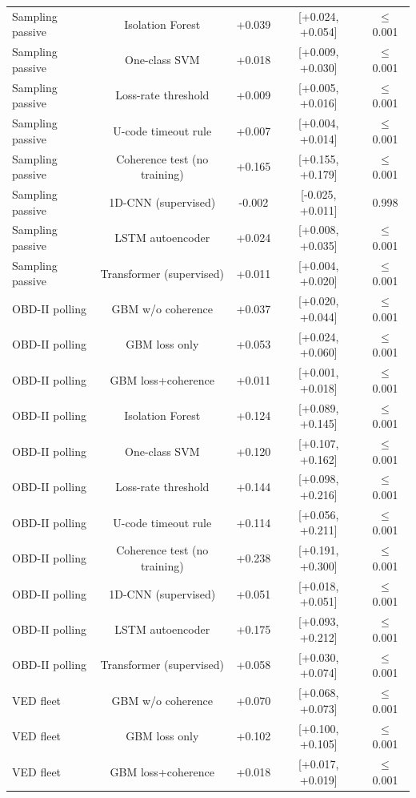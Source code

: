 \documentclass[10pt]{article}
\begin{document}
\begin{table}[!htbp]
{\begin{tabular}{@{}lcccc@{}}
Sampling passive & Isolation Forest & +0.039 & [+0.024, +0.054] & $\le$0.001 \\
Sampling passive & One-class SVM & +0.018 & [+0.009, +0.030] & $\le$0.001 \\
Sampling passive & Loss-rate threshold & +0.009 & [+0.005, +0.016] & $\le$0.001 \\
Sampling passive & U-code timeout rule & +0.007 & [+0.004, +0.014] & $\le$0.001 \\
Sampling passive & Coherence test (no training) & +0.165 & [+0.155, +0.179] & $\le$0.001 \\
Sampling passive & 1D-CNN (supervised) & -0.002 & [-0.025, +0.011] & 0.998 \\
Sampling passive & LSTM autoencoder & +0.024 & [+0.008, +0.035] & $\le$0.001 \\
Sampling passive & Transformer (supervised) & +0.011 & [+0.004, +0.020] & $\le$0.001 \\
\midrule
OBD-II polling & GBM w/o coherence & +0.037 & [+0.020, +0.044] & $\le$0.001 \\
OBD-II polling & GBM loss only & +0.053 & [+0.024, +0.060] & $\le$0.001 \\
OBD-II polling & GBM loss+coherence & +0.011 & [+0.001, +0.018] & $\le$0.001 \\
OBD-II polling & Isolation Forest & +0.124 & [+0.089, +0.145] & $\le$0.001 \\
OBD-II polling & One-class SVM & +0.120 & [+0.107, +0.162] & $\le$0.001 \\
OBD-II polling & Loss-rate threshold & +0.144 & [+0.098, +0.216] & $\le$0.001 \\
OBD-II polling & U-code timeout rule & +0.114 & [+0.056, +0.211] & $\le$0.001 \\
OBD-II polling & Coherence test (no training) & +0.238 & [+0.191, +0.300] & $\le$0.001 \\
OBD-II polling & 1D-CNN (supervised) & +0.051 & [+0.018, +0.051] & $\le$0.001 \\
OBD-II polling & LSTM autoencoder & +0.175 & [+0.093, +0.212] & $\le$0.001 \\
OBD-II polling & Transformer (supervised) & +0.058 & [+0.030, +0.074] & $\le$0.001 \\
\midrule
VED fleet & GBM w/o coherence & +0.070 & [+0.068, +0.073] & $\le$0.001 \\
VED fleet & GBM loss only & +0.102 & [+0.100, +0.105] & $\le$0.001 \\
VED fleet & GBM loss+coherence & +0.018 & [+0.017, +0.019] & $\le$0.001 \\

\end{tabular}}
\end{table}
\end{document}
